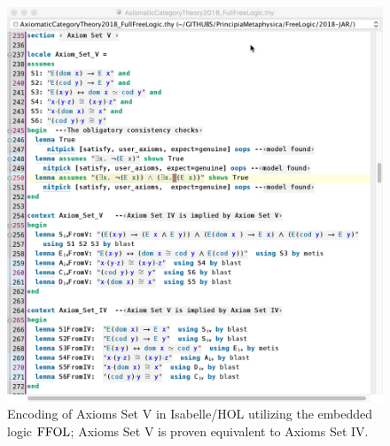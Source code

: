 \begin{figure}[htp]
 \includegraphics[width=\textwidth]{FFOL-Pic2}
 \caption{Encoding of Axioms Set V in Isabelle/HOL utilizing the
   embedded logic $\text{\textrm{FFOL}}$; Axioms Set V is proven equivalent to Axioms
   Set IV. \label{pic2}}
\end{figure}




